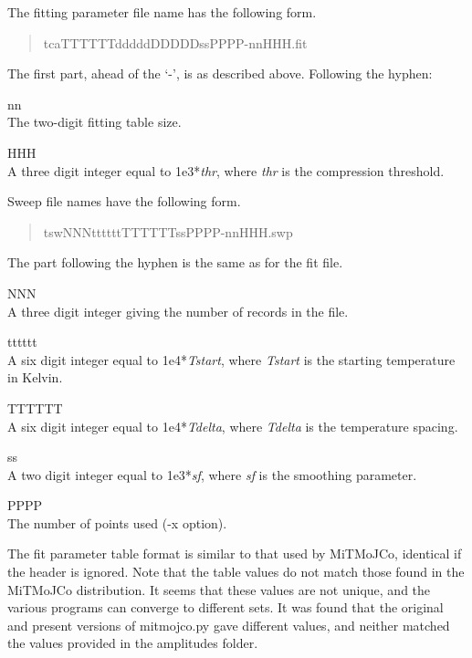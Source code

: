 The fitting parameter file name has the following form.
\begin{quote}\vt
tcaTTTTTTdddddDDDDDssPPPP-nnHHH.fit
\end{quote}

The first part, ahead of the `-', is as described above.  Following
the hyphen:
\begin{description}
\item{{\vt nn}\\
The two-digit fitting table size.}
\item{{\vt HHH}\\
A three digit integer equal to 1e3*{\it thr\/}, where {\it thr} is
the compression threshold.}
\end{description}

Sweep file names have the following form.
\begin{quote}\vt
tswNNNttttttTTTTTTssPPPP-nnHHH.swp
\end{quote}

The part following the hyphen is the same as for the fit file.
\begin{description}
\item{{\vt NNN}\\
A three digit integer giving the number of records in the file.}
\item{{\vt tttttt}\\
A six digit integer equal to 1e4*{\it Tstart\/}, where
{\it Tstart} is the starting temperature in Kelvin.}
\item{{\vt TTTTTT}\\
A six digit integer equal to 1e4*{\it Tdelta\/}, where
{\it Tdelta} is the temperature spacing.}
\item{{\vt ss}\\
A two digit integer equal to 1e3*{\it sf}, where {\it sf} is the
 smoothing parameter.}
\item{{\vt PPPP}\\
The number of points used ({\vt -x} option).}
\end{description}

The fit parameter table format is similar to that used by MiTMoJCo,
identical if the header is ignored.  Note that the table values do not
match those found in the MiTMoJCo distribution.  It seems that these
values are not unique, and the various programs can converge to
different sets.  It was found that the original and present versions
of {\vt mitmojco.py} gave different values, and neither matched the
values provided in the amplitudes folder.

